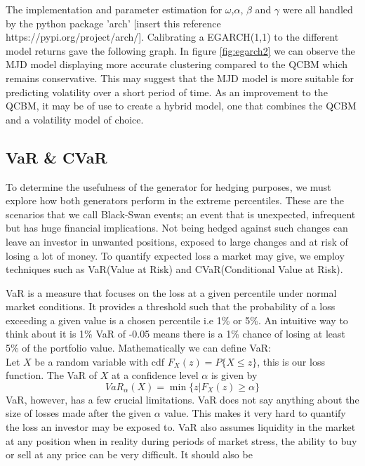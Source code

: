 \documentclass[12pt]{article}
\newcommand{\newp}
    {
    \vskip 0.5cm 
  }
\numberwithin{equation}{section}
\begin{document}
The implementation and parameter estimation for $\omega$,$\alpha$, $\beta$ and 
$\gamma$ were all handled by 
the python package 'arch' [insert this reference https://pypi.org/project/arch/]. 
Calibrating a EGARCH(1,1) to the different model returns gave the following graph. 
In figure \ref{fig:egarch2} we can observe the MJD model displaying more accurate 
clustering compared to the QCBM which remains conservative. This may suggest that 
the MJD model is more suitable for predicting volatility over a short period of 
time. As an improvement to the QCBM, it may be of use to create a hybrid model, 
one that combines the QCBM and a volatility model of choice. 

\newpage
\subsection{VaR \& CVaR}
To determine the usefulness of the generator for hedging purposes, we must explore 
how both generators perform in the extreme percentiles. These are the scenarios 
that we call Black-Swan events; an event that is unexpected, infrequent but has 
huge financial implications. Not being hedged against such changes can leave an 
investor in unwanted positions, exposed to large changes and at risk of losing 
a lot of money. To quantify expected loss a market may give, we employ techniques 
such as VaR(Value at Risk) and CVaR(Conditional Value at Risk). 
\newp 
VaR is a measure that focuses on the loss at a given percentile under normal 
market conditions. It provides a threshold such that the probability of a loss 
exceeding a given value is a chosen percentile i.e 1\% or 5\%. An intuitive 
way to think about it is 1\% VaR of -0.05 means there is a 1\% chance of 
losing at least 5\% of the portfolio value. Mathematically we can define VaR:\\ 
Let $X$ be a random variable with cdf $F_{X}(z)=P\{X\leq z\}$, this is our loss function. 
The VaR of $X$ at a confidence level $\alpha$ is given by
\begin{equation}
  VaR_\alpha(X) = \min\{z|F_X(z)\geq \alpha\}
\end{equation}
VaR, however, has a few crucial limitations. VaR does not say anything about the 
size of losses made after the given $\alpha$ value. This makes it very hard to 
quantify the loss an investor may be exposed to. VaR also assumes liquidity in 
the market at any position when in reality during periods of market stress, the 
ability to buy or sell at any price can be very difficult. It should also be 
\end{document}
